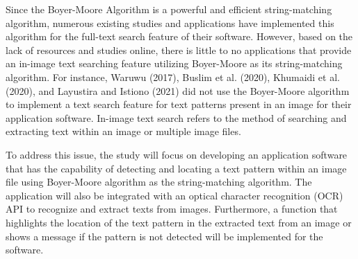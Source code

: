 \hfill

Since the Boyer-Moore Algorithm is a powerful and efficient string-matching algorithm, numerous existing studies and applications have implemented this algorithm for the full-text search feature of their software. However, based on the lack of resources and studies online, there is little to no applications that provide an in-image text searching feature utilizing Boyer-Moore as its string-matching algorithm. For instance, Waruwu (2017), Buslim et al. (2020), Khumaidi et al. (2020), and Layustira and Istiono (2021) did not use the Boyer-Moore algorithm to implement a text search feature for text patterns present in an image for their application software. In-image text search refers to the method of searching and extracting text within an image or multiple image files.

\hfill

To address this issue, the study will focus on developing an application software that has the capability of detecting and locating a text pattern within an image file using Boyer-Moore algorithm as the string-matching algorithm. The application will also be integrated with an optical character recognition (OCR) API to recognize and extract texts from images. Furthermore, a function that highlights the location of the text pattern in the extracted text from an image or shows a message if the pattern is not detected will be implemented for the software.

